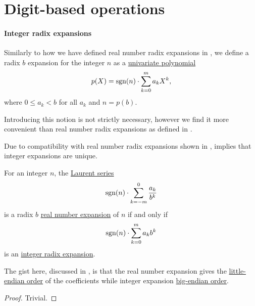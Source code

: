 \section{Digit-based operations}\label{sec:digit_based_operations}

\paragraph{Integer radix expansions}

\begin{definition}\label{def:integer_radix_expansion}
  Similarly to how we have defined real number radix expansions in , we define a radix \( b \) expansion for the integer \( n \) as a \hyperref[def:univariate_polynomial]{univariate polynomial}
  \begin{equation*}
    p(X) = \operatorname{sgn}(n) \cdot \sum_{k=0}^m a_k X^k,
  \end{equation*}
  where \( 0 \leq a_k < b \) for all \( a_k \) and \( n = p(b) \).
\end{definition}
\begin{comments}
  \item Introducing this notion is not strictly necessary, however we find it more convenient than real number radix expansions as defined in .

  \item Due to compatibility with real number radix expansions shown in ,  implies that integer expansions are unique.
\end{comments}

\begin{proposition}\label{thm:integer_and_real_radix_expansions}
  For an integer \( n \), the \hyperref[def:formal_laurent_series]{Laurent series}
  \begin{equation}\label{eq:thm:integer_and_real_radix_expansions/series}
    \operatorname{sgn}(n) \cdot \sum_{k=-m}^0 \frac {a_k} {b^k}
  \end{equation}
  is a radix \( b \) \hyperref[def:real_number_radix_expansion]{real number expansion} of \( n \) if and only if
  \begin{equation}\label{eq:thm:integer_and_real_radix_expansions/polynomial}
    \operatorname{sgn}(n) \cdot \sum_{k=0}^m a_k b^k
  \end{equation}
  is an \hyperref[def:integer_radix_expansion]{integer radix expansion}.
\end{proposition}
\begin{comments}
  \item The gist here, discussed in , is that the real number expansion gives the \hyperref[def:endianness_and_numbers]{little-endian order} of the coefficients while integer expansion \hyperref[def:endianness_and_numbers]{big-endian order}.
\end{comments}
\begin{proof}
  Trivial.
\end{proof}

